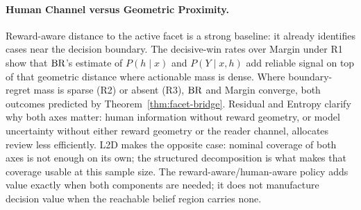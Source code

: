\paragraph{Human Channel versus Geometric Proximity.}
Reward-aware distance to the active facet is a strong baseline: it already identifies cases near the decision boundary.
The decisive-win rates over Margin under R1 show that $\operatorname{BR}$'s estimate of $P(h\mid x)$ and $P(Y\mid x,h)$ add reliable signal on top of that geometric distance where actionable mass is dense.
Where boundary-regret mass is sparse (R2) or absent (R3), $\operatorname{BR}$ and Margin converge, both outcomes predicted by Theorem~\ref{thm:facet-bridge}.
Residual and Entropy clarify why both axes matter: human information without reward geometry, or model uncertainty without either reward geometry or the reader channel, allocates review less efficiently.
L2D makes the opposite case: nominal coverage of both axes is not enough on its own; the structured decomposition is what makes that coverage usable at this sample size.
The reward-aware/human-aware policy adds value exactly when both components are needed; it does not manufacture decision value when the reachable belief region carries none.
